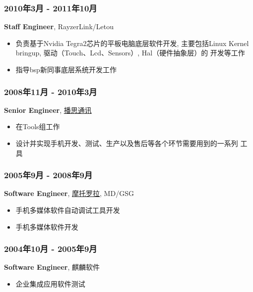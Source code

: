 \documentclass[11pt,dvipdfm,CJKbookmarks]{article}
\begin{document}
\begin{CJK*}{UTF8}{simsun}
\subsubsection{2010年3月 - 2011年10月}
\label{sec-1-0-2}

\textbf{Staff Engineer}, RayzerLink/Letou

\begin{itemize}
\item 负责基于Nvidia Tegra2芯片的平板电脑底层软件开发, 主要包括Linux
Kernel bringup, 驱动（Touch、Lcd、Sensors）, Hal（硬件抽象层）的
开发等工作

\item 指导bsp新同事底层系统开发工作
\end{itemize}
\subsubsection{2008年11月 - 2010年3月}
\label{sec-1-0-3}

\textbf{Senior Engineer}, \href{http://www.borqs.com}{播思通讯}

\begin{itemize}
\item 在Tools组工作

\item 设计并实现手机开发、测试、生产以及售后等各个环节需要用到的一系列
工具
\end{itemize}

\subsubsection{2005年9月 - 2008年9月}
\label{sec-1-0-4}

\textbf{Software Engineer}, \href{http://motorola.com}{摩托罗拉},  MD/GSG

\begin{itemize}
\item 手机多媒体软件自动调试工具开发

\item 手机多媒体软件开发
\end{itemize}
\subsubsection{2004年10月 - 2005年9月}
\label{sec-1-0-5}
\textbf{Software Engineer}, 麒麟软件

\begin{itemize}
\item 企业集成应用软件测试
\end{itemize}

\end{CJK*}
\end{document}
